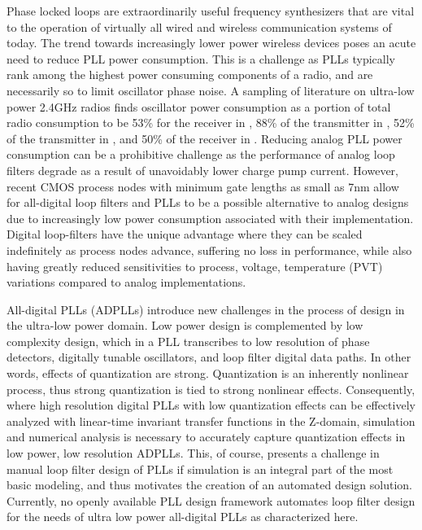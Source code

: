 Phase locked loops are extraordinarily useful frequency synthesizers that are vital to the operation of virtually all wired and wireless communication systems of today. The trend towards increasingly lower power wireless devices poses an acute need to reduce PLL power consumption. This is a challenge as PLLs typically rank among the highest power consuming components of a radio, and are necessarily so to limit oscillator phase noise. A sampling of literature on ultra-low power 2.4GHz radios finds oscillator power consumption as a portion of total radio consumption to be 53\% for the receiver in \cite{regulagadda_2018}, 88\% of the transmitter in \cite{shi_2019}, 52\% of the transmitter in \cite{chen_2019}, and 50\% of the receiver in \cite{pengg_2013}. Reducing analog PLL power consumption can be a prohibitive challenge as the performance of analog loop filters degrade as a result of unavoidably lower charge pump current. However, recent CMOS process nodes with minimum gate lengths as small as 7nm allow for all-digital loop filters and PLLs to be a possible alternative to analog designs due to increasingly low power consumption associated with their implementation. Digital loop-filters have the unique advantage where they can be scaled indefinitely as process nodes advance, suffering no loss in performance, while also having greatly reduced sensitivities to process, voltage, temperature (PVT) variations compared to analog implementations.

All-digital PLLs (ADPLLs) introduce new challenges in the process of design in the ultra-low power domain. Low power design is complemented by low complexity design, which in a PLL transcribes to low resolution of phase detectors, digitally tunable oscillators, and loop filter digital data paths. In other words, effects of quantization are strong. Quantization is an inherently nonlinear process, thus strong quantization is tied to strong nonlinear effects. Consequently, where high resolution digital PLLs with low quantization effects can be effectively analyzed with linear-time invariant transfer functions in the Z-domain, simulation and numerical analysis is necessary to accurately capture quantization effects in low power, low resolution ADPLLs. This, of course, presents a challenge in manual loop filter design of PLLs if simulation is an integral part of the most basic modeling, and thus motivates the creation of an automated design solution. Currently, no openly available PLL design framework automates loop filter design for the needs of ultra low power all-digital PLLs as characterized here. 

